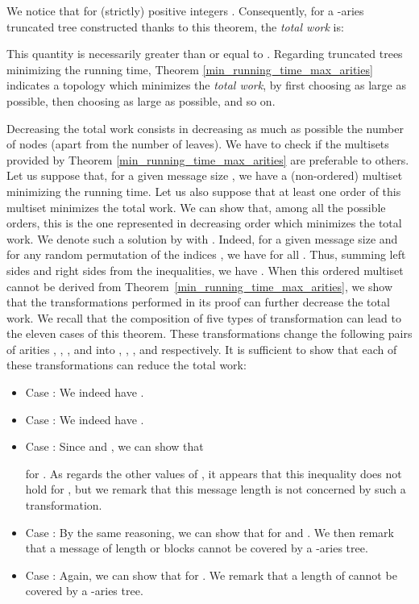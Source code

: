 \documentclass{llncs}
\begin{document}
We notice that  for (strictly) 
positive integers . Consequently, for a -aries truncated tree constructed thanks to this theorem, the \textit{total work} is:


This quantity is necessarily greater than or equal to . Regarding truncated trees minimizing the running time, 
Theorem \ref{min_running_time_max_arities} indicates a topology which minimizes the \emph{total work}, by first choosing  as large as possible, 
then choosing  as large as possible, and so on.

\begin{remark}
 Decreasing the total work consists in decreasing as much as possible the number of nodes (apart from the number of leaves). We have to
 check if the multisets provided by Theorem \ref{min_running_time_max_arities} are preferable to others.
 Let us suppose that, for a given message size , we have a (non-ordered) multiset minimizing
 the running time.
 Let us also suppose  that at least one order of this multiset minimizes the total work.
We can show that, among all the possible orders, this is the one represented in decreasing order
 which minimizes the total work. 
 We denote such a solution by  with .
 Indeed, for a given message size  and for any random permutation  of the indices , we have 
  for all . Thus, summing left sides and right sides from the 
 inequalities, we have .
 When this ordered multiset cannot be derived from Theorem~\ref{min_running_time_max_arities}, we show that the transformations performed in its proof
 can further decrease the total work. We recall that the composition of five types of transformation 
 can lead to the eleven cases of this theorem. These transformations change the following pairs of arities , , ,  and  
 into , , ,  and  respectively.
 It is sufficient to show that each of these transformations can reduce the total work:
 \begin{itemize}
  \item Case : We indeed have .
  \item Case : We indeed have .
  \item Case : Since  
  and , we can show that
  
  for . As regards the other values of , it appears that this inequality does not hold
  for , but we remark that this message length is not concerned by such a transformation.
  \item Case : By the same reasoning, we can show that 
   for  and .
  We then remark that a message of length  or  blocks cannot be covered by a -aries tree.
  \item Case : Again, we can show that 
   for .
  We remark that a length of  cannot be covered by a -aries tree.
 \end{itemize}

\end{remark}
\end{document}
